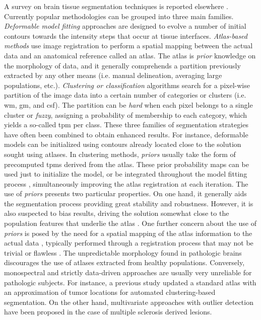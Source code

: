 A survey on brain tissue segmentation techniques is reported elsewhere 
  \citep{liew_current_2006}.
Currently popular methodologies can be grouped into three main
  families.
\emph{Deformable model fitting} approaches
  \citep{suri_leaking_2000,yushkevich_user-guided_2006,roura_marga:_2012,delibasis_novel_2013,dang_validation_2013}
  are designed to evolve a number of initial contours
  towards the intensity steps that occur at tissue
  interfaces.
\emph{Atlas-based methods} \citep{gorthi_active_2011}
  use image registration
  to perform a spatial mapping between the actual data
  and an anatomical reference called an atlas.
The atlas is \emph{prior} knowledge on the morphology
  of data, and it generally comprehends a partition previously 
  extracted by any other means (i.e. manual delineation,
  averaging large populations, etc.).
\emph{Clustering or classification} algorithms
  \citep{van_leemput_automated_1999-1,ahmed_modified_2002,
  vrooman_multi-spectral_2007,ji_generalized_2012}
  search for a pixel-wise partition of the image 
  data into a certain number of categories or clusters
  (i.e. \gls*{wm}, \gls*{gm}, and \gls*{csf}).
The partition can be \emph{hard} when each pixel belongs
  to a single cluster or \emph{fuzzy},
  assigning a probability of membership to
  each category, which yields a so-called \gls*{tpm} 
  per class.
These three families of segmentation strategies have often been
  combined to obtain enhanced results.
For instance, deformable models can be initialized
  using contours already located close to the solution 
  sought using atlases.
In clustering methods, \emph{priors} usually take the
  form of precomputed \glspl*{tpm} derived from the atlas.
These prior probability maps can be used just to initialize
  the model, or be integrated throughout the model fitting
  process \citep{ashburner_unified_2005}, simultaneously
  improving the atlas registration at each iteration.
The use of \emph{priors} presents two particular properties.
On one hand, it generally aids the segmentation
  process providing great stability and robustness.
However, it is also suspected to bias results,
  driving the solution somewhat close to the
  population features that underlie the atlas
  \citep{davatzikos_why_2004}.
One further concern about the use of \emph{priors} is
  posed by the need for a spatial mapping of the atlas
  information to the actual data 
  \citep{bookstein_voxel-based_2001,
  ashburner_why_2001}, typically performed through a
  registration process that may not be trivial or
  flawless \citep{crum_zen_2003}.
The unpredictable morphology found in pathologic brains
  discourages the use of atlases extracted from healthy populations.
Conversely, monospectral and strictly data-driven approaches are
  usually very unreliable for pathologic subjects.
For instance, a previous study \citep{prastawa_automatic_2003} updated a
  standard atlas with an approximation of tumor locations for automated
  clustering-based segmentation.
On the other hand, multivariate approaches with outlier detection
  \citep{van_leemput_automated_2001} have been proposed in the
  case of multiple sclerosis derived lesions.

